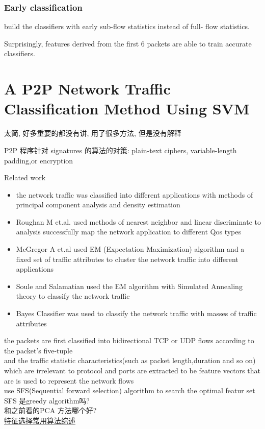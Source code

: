 \documentclass{article}
\begin{document}
\subsubsection{Early classification}\label{early-classification}
build the classifiers with early sub-flow statistics instead of full- flow statistics.

Surprisingly, features derived from the first 6 packets are able to train accurate classifiers.

\section{A P2P Network Traffic Classification Method Using SVM}\label{a-p2p-network-traffic-classification-method-using-svm}
太简, 好多重要的都没有讲, 用了很多方法, 但是没有解释

P2P 程序针对 signatures 的算法的对策: plain-text ciphers, variable-length padding,or encryption

Related work
\begin{itemize}
\item the network traffic was classified into different applications with methods of principal component analysis and density estimation 
\item Roughan M et.al. used methods of nearest neighbor and linear discriminate to analysis successfully map the network application to different Qos types 
\item McGregor A et.al used EM (Expectation Maximization) algorithm and a fixed set of traffic attributes to cluster the network traffic into different applications 
\item Soule and Salamatian used the EM algorithm with Simulated Annealing theory to classify the network traffic 
\item Bayes Classifier was used to classify the network traffic with masses of traffic attributes
\end{itemize}

the packets are first classified into bidirectional TCP or UDP flows according to the packet's five-tuple\\
and the traffic statistic characteristics(such as packet length,duration and so on) which are irrelevant to protocol and ports are extracted to be feature vectors that are is used to represent the network flows\\
use SFS(Sequential forward selection) algorithm to search the optimal featur set\\
SFS 是greedy algorithm吗?\\
和之前看的PCA 方法哪个好?\\
\href{http://www.cnblogs.com/heaad/archive/2011/01/02/1924088.html}{特征选择常用算法综述}
\end{document}
